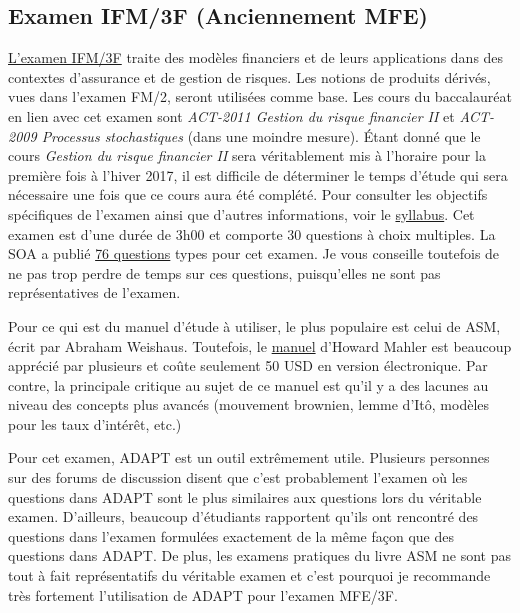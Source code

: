 \newpage
\subsection*{Examen IFM/3F (Anciennement MFE)}
\label{subsec:exammfe}
\href{https://www.soa.org/education/exam-req/edu-exam-mfe-detail.aspx}{L'examen IFM/3F} traite des modèles financiers et de leurs applications dans des contextes d'assurance et de gestion de risques. Les notions de produits dérivés, vues dans l'examen FM/2, seront utilisées comme base. Les cours du baccalauréat en lien avec cet examen sont \textit{ACT-2011 Gestion du risque financier II} et \textit{ACT-2009 Processus stochastiques} (dans une moindre mesure). Étant donné que le cours \textit{Gestion du risque financier II} sera véritablement mis à l'horaire pour la première fois à l'hiver 2017, il est difficile de déterminer le temps d'étude qui sera nécessaire une fois que ce cours aura été complété. Pour consulter les objectifs spécifiques de l'examen ainsi que d'autres informations, voir le \href{https://www.soa.org/Files/Edu/2016/edu-2016-11-mfe-syllabus.pdf}{syllabus}. Cet examen est d'une durée de 3h00 et comporte 30 questions à choix multiples. La SOA a publié \href{http://www.soa.org/files/edu/edu-exam-mfe-sample-quest-sol.pdf}{76 questions} types pour cet examen. Je vous conseille toutefois de ne pas trop perdre de temps sur ces questions, puisqu'elles ne sont pas représentatives de l'examen.\vspace{\baselineskip}

Pour ce qui est du manuel d'étude à utiliser, le plus populaire est celui de ASM, écrit par Abraham Weishaus. Toutefois, le \href{http://howardmahler.com/Teaching/MFE.html}{manuel} d'Howard Mahler est beaucoup apprécié par plusieurs et coûte seulement 50 USD en version électronique. Par contre, la principale critique au sujet de ce manuel est qu'il y a des lacunes au niveau des concepts plus avancés (mouvement brownien, lemme d'Itô, modèles pour les taux d'intérêt, etc.)\vspace{\baselineskip}

Pour cet examen, ADAPT est un outil extrêmement utile. Plusieurs personnes sur des forums de discussion disent que c'est probablement l'examen où les questions dans ADAPT sont le plus similaires aux questions lors du véritable examen. D'ailleurs, beaucoup d'étudiants rapportent qu'ils ont rencontré des questions dans l'examen formulées exactement de la même façon que des questions dans ADAPT. De plus, les examens pratiques du livre ASM ne sont pas tout à fait représentatifs du véritable examen et c'est pourquoi je recommande très fortement l'utilisation de ADAPT pour l'examen MFE/3F.\vspace{\baselineskip}

